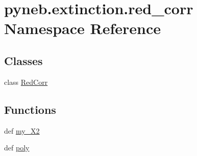 \hypertarget{namespacepyneb_1_1extinction_1_1red__corr}{\section{pyneb.\-extinction.\-red\-\_\-corr Namespace Reference}
\label{namespacepyneb_1_1extinction_1_1red__corr}
}
\subsection*{Classes}
\begin{DoxyCompactItemize}
\item 
class \hyperlink{classpyneb_1_1extinction_1_1red__corr_1_1_red_corr}{Red\-Corr}
\end{DoxyCompactItemize}
\subsection*{Functions}
\begin{DoxyCompactItemize}
\item 
def \hyperlink{namespacepyneb_1_1extinction_1_1red__corr_a5bee333b0bb8fb9ad4567e8b2de832ed}{my\-\_\-\-X2}
\item 
def \hyperlink{namespacepyneb_1_1extinction_1_1red__corr_ae587819f2a81c5dfbd7b7ce819c497ca}{poly}
\end{DoxyCompactItemize}


